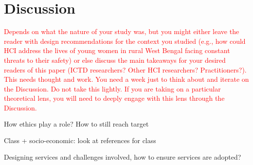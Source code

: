 \section{Discussion}
\textcolor{red}{Depends on what the nature of your study was, but you might either leave the reader with design recommendations for the context you studied (e.g., how could HCI address the lives of young women in rural West Bengal facing constant threats to their safety) or else discuss the main takeaways for your desired readers of this paper (ICTD researchers? Other HCI researchers? Practitioners?). This needs thought and work. You need a week just to think about and iterate on the Discussion. Do not take this lightly. If you are taking on a particular theoretical lens, you will need to deeply engage with this lens through the Discussion. 
}

How ethics play a role? How to still reach target

Class + socio-economic: look at references for class

Designing services and challenges involved, how to ensure services are adopted?
